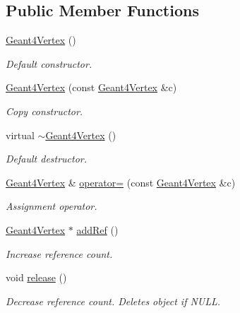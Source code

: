 \subsection*{Public Member Functions}
\begin{DoxyCompactItemize}
\item 
\hyperlink{class_d_d4hep_1_1_simulation_1_1_geant4_vertex_a6c266fa18efd7d4976c36074856c8bc4}{Geant4Vertex} ()
\begin{DoxyCompactList}\small\item\em Default constructor. \item\end{DoxyCompactList}\item 
\hyperlink{class_d_d4hep_1_1_simulation_1_1_geant4_vertex_a5a5ec2a00b5e3fcdd5bd4b5e02131dbc}{Geant4Vertex} (const \hyperlink{class_d_d4hep_1_1_simulation_1_1_geant4_vertex}{Geant4Vertex} \&c)
\begin{DoxyCompactList}\small\item\em Copy constructor. \item\end{DoxyCompactList}\item 
virtual \hyperlink{class_d_d4hep_1_1_simulation_1_1_geant4_vertex_a82165b580eeb1104f6ff9ff27235fba7}{$\sim$Geant4Vertex} ()
\begin{DoxyCompactList}\small\item\em Default destructor. \item\end{DoxyCompactList}\item 
\hyperlink{class_d_d4hep_1_1_simulation_1_1_geant4_vertex}{Geant4Vertex} \& \hyperlink{class_d_d4hep_1_1_simulation_1_1_geant4_vertex_ac96f6fd10cd02f1920b937421832ca46}{operator=} (const \hyperlink{class_d_d4hep_1_1_simulation_1_1_geant4_vertex}{Geant4Vertex} \&c)
\begin{DoxyCompactList}\small\item\em Assignment operator. \item\end{DoxyCompactList}\item 
\hyperlink{class_d_d4hep_1_1_simulation_1_1_geant4_vertex}{Geant4Vertex} $\ast$ \hyperlink{class_d_d4hep_1_1_simulation_1_1_geant4_vertex_a9cf0eeb1c981f0f7ae77c0e2776340e6}{addRef} ()
\begin{DoxyCompactList}\small\item\em Increase reference count. \item\end{DoxyCompactList}\item 
void \hyperlink{class_d_d4hep_1_1_simulation_1_1_geant4_vertex_a55c0c51d6d234531cdd6efe1ab83fc37}{release} ()
\begin{DoxyCompactList}\small\item\em Decrease reference count. Deletes object if NULL. \item\end{DoxyCompactList}\end{DoxyCompactItemize}
